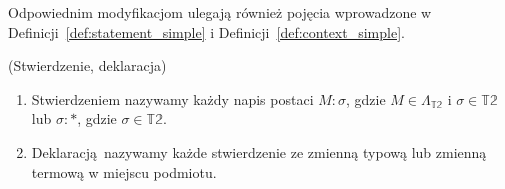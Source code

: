 Odpowiednim modyfikacjom ulegają również pojęcia wprowadzone w Definicji~\ref{def:statement_simple} i Definicji~\ref{def:context_simple}.
\begin{definicja}(Stwierdzenie, deklaracja)
    \begin{enumerate}
  \setlength\itemsep{0em}
    \item Stwierdzeniem nazywamy każdy napis postaci \(M:\sigma\), gdzie \(M\in\Lambda_\mathbb{T2}\) i \(\sigma\in \mathbb{T2}\) lub \(\sigma:*\), gdzie \(\sigma\in\mathbb{T2}\).
    \item  Deklaracją nazywamy każde stwierdzenie ze zmienną typową lub zmienną termową w miejscu podmiotu.
  \end{enumerate}

 \end{definicja}
